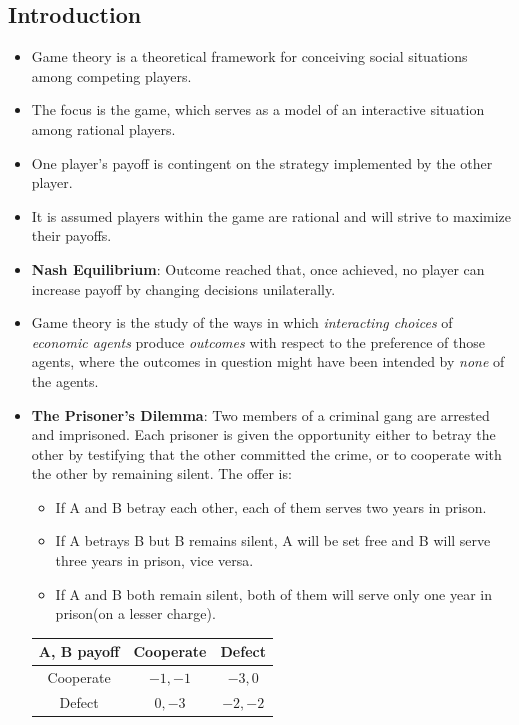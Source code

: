 \documentclass[a4paper]{article}
\begin{document}
\subsection{Introduction}
\begin{itemize}
    \item Game theory is a theoretical framework for conceiving social situations among competing players.
    \item The focus is the game, which serves as a model of an interactive situation among rational players.
    \item One player's payoff is contingent on the strategy implemented by the other player.
    \item It is assumed players within the game are rational and will strive to maximize their payoffs.
    \item \textbf{Nash Equilibrium}: Outcome reached that, once achieved, no player can increase payoff by changing decisions unilaterally.
    \item Game theory is the study of the ways in which \textit{interacting choices} of \textit{economic agents} produce \textit{outcomes} with respect to the preference of those agents, where the outcomes in question might have been intended by \textit{none} of the agents.
    \item \textbf{The Prisoner's Dilemma}: Two members of a criminal gang are arrested and imprisoned. Each prisoner is given the opportunity either to betray the other by testifying that the other committed the crime, or to cooperate with the other by remaining silent. The offer is:
    \begin{itemize}
        \item If A and B betray each other, each of them serves two years in prison.
        \item If A betrays B but B remains silent, A will be set free and B will serve three years in prison, vice versa.
        \item If A and B both remain silent, both of them will serve only one year in prison(on a lesser charge).
    \end{itemize}
    \begin{table}[H]
        \centering
        \begin{tabular}{|c|c|c|}
            \hline
            A, B payoff & Cooperate & Defect \\
            \hline
            Cooperate & $-1, -1$ & $-3, 0$\\
            \hline
            Defect & $0,-3$ & $-2,-2$\\

\end{tabular}
\end{table}
\end{itemize}
\end{document}
